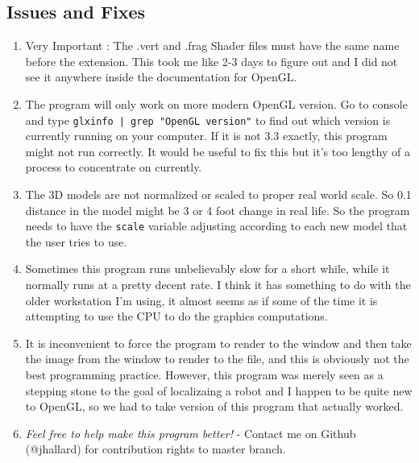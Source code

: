 \documentclass[a4paper,11pt]{article}
\begin{document}
	\subsection{Issues and Fixes}
	  \begin{enumerate}
	  \item Very Important : The .vert and .frag Shader files must have the same name before the extension. This took me like 2-3 days to figure out and I did not see it anywhere inside the documentation for OpenGL.
          \item The program will only work on more modern OpenGL version. Go to console and type \texttt{glxinfo | grep "OpenGL version"} to find out which version is currently running on your computer. If it is not 3.3 exactly, this program might not run correctly. It would be useful to fix this but it's too lengthy of a process to concentrate on currently.
          \item The 3D models are not normalized or scaled to proper real world scale. So 0.1 distance in the model might be 3 or 4 foot change in real life. So the program needs to have the \texttt{scale} variable adjusting according to each new model that the user tries to use.
          \item Sometimes this program runs unbelievably slow for a short while, while it normally runs at a pretty decent rate. I think it has something to do with the older workstation I'm using, it almost seems as if some of the time it is attempting to use the CPU to do the graphics computations.
          \item It is inconvenient to force the program to render to the window and then take the image from the window to render to the file, and this is obviously not the best programming practice. However, this program was merely seen as a stepping stone to the goal of localizaing a robot and I happen to be quite new to OpenGL, so we had to take version of this program that actually worked. 
          \item \emph{Feel free to help make this program better!} - Contact me on Github (@jhallard) for contribution rights to master branch.
         \end{enumerate}
\end{document}
